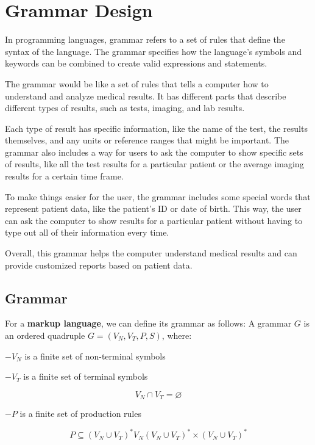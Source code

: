 \chapter{Grammar Design}

In programming languages, grammar refers to a set of rules that define the syntax of the language. The grammar specifies how the language's symbols and keywords can be combined to create valid expressions and statements.

The grammar would be like a set of rules that tells a computer how to understand and analyze medical results. It has different parts that describe different types of results, such as tests, imaging, and lab results.

Each type of result has specific information, like the name of the test, the results themselves, and any units or reference ranges that might be important. The grammar also includes a way for users to ask the computer to show specific sets of results, like all the test results for a particular patient or the average imaging results for a certain time frame.

To make things easier for the user, the grammar includes some special words that represent patient data, like the patient's ID or date of birth. This way, the user can ask the computer to show results for a particular patient without having to type out all of their information every time.

Overall, this grammar helps the computer understand medical results and can provide customized reports based on patient data.

\section{Grammar}
For a \textbf{markup language}, we can define its grammar as follows:
A grammar \(G\) is an ordered quadruple \(G = (V_{N}, V_{T}, P, S)\), where:

\( -V_{N}\) is a finite set of non-terminal symbols

\( -V_{T}\) is a finite set of terminal symbols

\begin{equation}
    V_{N}\cap V_{T} = \varnothing 
\end{equation} 

    \( -P\) is a finite set of production rules
    
\begin{equation}
    P\subseteq\left(V_{N}\cup V_{T}\right)^{\ast }V_{N}\left(V_{N}\cup V_{T}\right)^{\ast }\times\left(V_{N}\cup V_{T}\right)^{\ast }
\end{equation}

